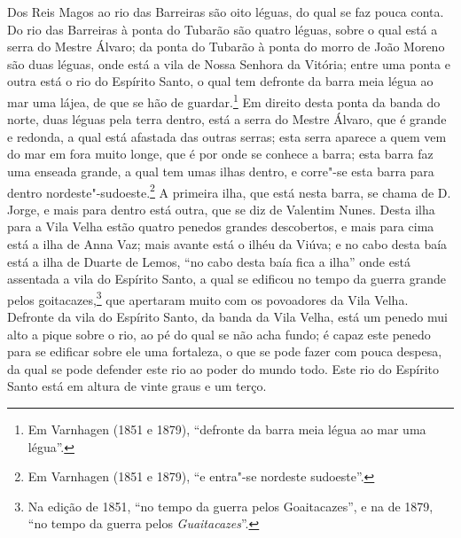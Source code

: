 \begin{linenumbers}
Dos Reis Magos ao rio das Barreiras são oito léguas, do qual se faz pouca conta. Do rio
das Barreiras à ponta do Tubarão são quatro léguas, sobre o qual está a serra do Mestre
Álvaro; da ponta do Tubarão à ponta do morro de João Moreno são duas léguas, onde está a
vila de Nossa Senhora da Vitória; entre uma ponta e outra está o rio do Espírito Santo, o
qual tem defronte da barra meia légua ao mar uma lájea, de que se hão de
guardar.\footnote{ Em Varnhagen (1851 e 1879), ``defronte da barra meia légua ao mar uma
légua''.} Em direito desta ponta da banda do norte, duas léguas pela terra dentro, está a
serra do Mestre Álvaro, que é grande e redonda, a qual está afastada das outras serras;
esta serra aparece a quem vem do mar em fora muito longe, que é por onde se conhece a
barra; esta barra faz uma enseada grande, a qual tem umas ilhas dentro, e corre"-se esta
barra para dentro nordeste"-sudoeste.\footnote{ Em Varnhagen (1851 e 1879), ``e entra"-se
nordeste sudoeste''.} A primeira ilha, que está nesta barra, se chama de D. Jorge, e mais
para dentro está outra, que se diz de Valentim Nunes. Desta ilha para a Vila Velha estão
quatro penedos grandes descobertos, e mais para cima está a ilha de Anna Vaz; mais avante
está o ilhéu da Viúva; e no cabo desta baía está a ilha de Duarte de Lemos, ``no cabo
desta baía fica a ilha'' onde está assentada a vila do Espírito Santo, a qual se edificou
no tempo da guerra grande pelos goitacazes,\footnote{ Na edição de 1851, ``no tempo da
guerra pelos Goaitacazes'', e na de 1879, ``no tempo da guerra pelos
\textit{Guaitacazes}''.} que apertaram muito com os povoadores da Vila Velha. Defronte da
vila do Espírito Santo, da banda da Vila Velha, está um penedo mui alto a pique sobre o
rio, ao pé do qual se não acha fundo; é capaz este penedo para se edificar sobre ele uma
fortaleza, o que se pode fazer com pouca despesa, da qual se pode defender este rio ao
poder do mundo todo. Este rio do Espírito Santo está em altura de vinte graus e um terço.


\end{linenumbers}
